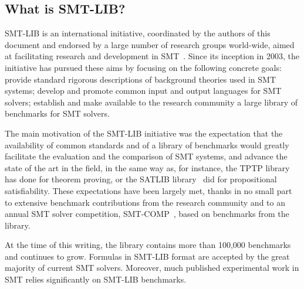 \subsection{What is SMT-LIB?}




SMT-LIB is an international initiative,
coordinated by the authors of this document and 
endorsed by a large number of research groups world-wide,
aimed at facilitating research and development in SMT~\cite{SMT-LIB}.
Since its inception in 2003, the initiative has pursued these aims
by focusing on the following concrete goals:
provide standard rigorous descriptions of background theories used in SMT systems;
develop and promote common input and output languages for SMT solvers;
establish and make available to the research community a large library of
benchmarks for SMT solvers. 

The main motivation of the SMT-LIB initiative was the expectation that 
the availability of common standards and of a library of benchmarks would 
greatly facilitate the evaluation and the comparison of SMT systems,
and advance the state of the art in the field,
in the same way as, for instance,
the TPTP library~\cite{Sut-JAR-09} has done for theorem proving,
or the SATLIB library~\cite{HooStu-SAT-00} did 
for propositional satisfiability.
These expectations have been largely met, 
thanks in no small part 
to extensive benchmark contributions from the research community and
to an annual SMT solver competition, SMT-COMP~\cite{BardMS-CAV-05},
based on benchmarks from the library.

At the time of this writing, 
the library contains more than 100,000 benchmarks and continues to grow.
Formulas in SMT-LIB format are accepted by the great majority 
of current SMT solvers.
Moreover, much published experimental work in SMT relies significantly 
on SMT-LIB benchmarks.



